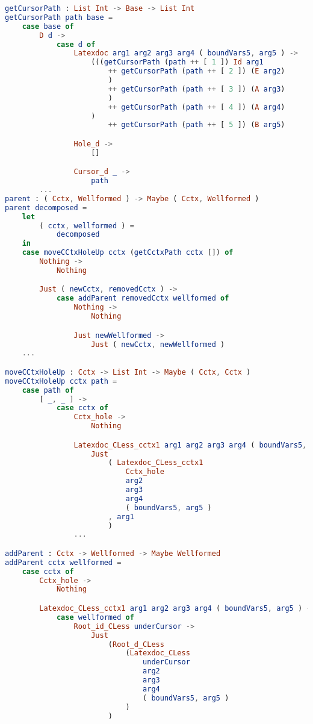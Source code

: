 \begin{lstlisting}[style=inline, language=elm, caption={Generated functions for cursor movement for the \LaTeX language}, label={lst:latex-movement}]
getCursorPath : List Int -> Base -> List Int
getCursorPath path base =
    case base of
        D d ->
            case d of
                Latexdoc arg1 arg2 arg3 arg4 ( boundVars5, arg5 ) ->
                    (((getCursorPath (path ++ [ 1 ]) Id arg1
                        ++ getCursorPath (path ++ [ 2 ]) (E arg2)
                        )
                        ++ getCursorPath (path ++ [ 3 ]) (A arg3)
                        )
                        ++ getCursorPath (path ++ [ 4 ]) (A arg4)
                    )
                        ++ getCursorPath (path ++ [ 5 ]) (B arg5)

                Hole_d ->
                    []

                Cursor_d _ ->
                    path
        ...
parent : ( Cctx, Wellformed ) -> Maybe ( Cctx, Wellformed )
parent decomposed =
    let
        ( cctx, wellformed ) =
            decomposed
    in
    case moveCCtxHoleUp cctx (getCctxPath cctx []) of
        Nothing ->
            Nothing

        Just ( newCctx, removedCctx ) ->
            case addParent removedCctx wellformed of
                Nothing ->
                    Nothing

                Just newWellformed ->
                    Just ( newCctx, newWellformed )
    ...

moveCCtxHoleUp : Cctx -> List Int -> Maybe ( Cctx, Cctx )
moveCCtxHoleUp cctx path =
    case path of
        [ _, _ ] ->
            case cctx of
                Cctx_hole ->
                    Nothing

                Latexdoc_CLess_cctx1 arg1 arg2 arg3 arg4 ( boundVars5, arg5 ) ->
                    Just
                        ( Latexdoc_CLess_cctx1
                            Cctx_hole
                            arg2
                            arg3
                            arg4
                            ( boundVars5, arg5 )
                        , arg1
                        )
                ...

addParent : Cctx -> Wellformed -> Maybe Wellformed
addParent cctx wellformed =
    case cctx of
        Cctx_hole ->
            Nothing

        Latexdoc_CLess_cctx1 arg1 arg2 arg3 arg4 ( boundVars5, arg5 ) ->
            case wellformed of
                Root_id_CLess underCursor ->
                    Just
                        (Root_d_CLess
                            (Latexdoc_CLess
                                underCursor
                                arg2
                                arg3
                                arg4
                                ( boundVars5, arg5 )
                            )
                        )


\end{lstlisting}
